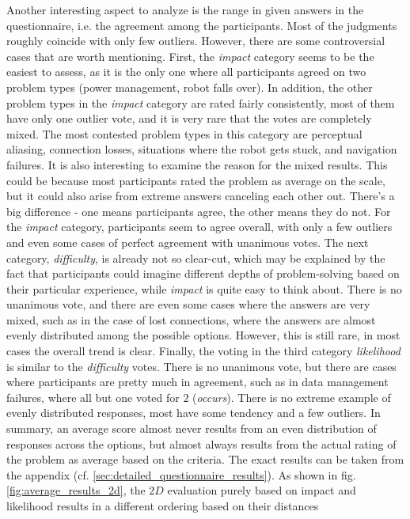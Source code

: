 \documentclass[english, master, utf8]{base/thesis_KBS}
\begin{document}
\noindent
Another interesting aspect to analyze is the range in given answers in the questionnaire, i.e. the agreement among the participants. Most of the judgments roughly coincide with
only few outliers. However, there are some controversial cases that are worth mentioning. First, the \textit{impact} category seems to be the easiest to assess, as it is the only
one where all participants agreed on two problem types (power management, robot falls over). In addition, the other problem types in the \textit{impact} category are rated fairly
consistently, most of them have only one outlier vote, and it is very rare that the votes are completely mixed. The most contested problem types in this category are perceptual
aliasing, connection losses, situations where the robot gets stuck, and navigation failures. It is also interesting to examine the reason for the mixed results. This could be
because most participants rated the problem as average on the scale, but it could also arise from extreme answers canceling each other out. There's a big difference - one means
participants agree, the other means they do not. For the \textit{impact} category, participants seem to agree overall, with only a few outliers and even some cases of perfect
agreement with unanimous votes. The next category, \textit{difficulty}, is already not so clear-cut, which may be explained by the fact that participants could imagine different
depths of problem-solving based on their particular experience, while \textit{impact} is quite easy to think about. There is no unanimous vote, and there are even some cases where
the answers are very mixed, such as in the case of lost connections, where the answers are almost evenly distributed among the possible options. However, this is still rare, in most
cases the overall trend is clear. Finally, the voting in the third category \textit{likelihood} is similar to the \textit{difficulty} votes. There is no unanimous vote, but there
are cases where participants are pretty much in agreement, such as in data management failures, where all but one voted for $2$ (\textit{occurs}). There is no extreme example of
evenly distributed responses, most have some tendency and a few outliers. In summary, an average score almost never results from an even distribution of responses across the options,
but almost always results from the actual rating of the problem as average based on the criteria. The exact results can be taken from the appendix 
(cf. \ref{sec:detailed_questionnaire_results}). As shown in fig. \ref{fig:average_results_2d}, the $2D$ evaluation purely based on impact and likelihood results in a different ordering based on their distances 
\end{document}
